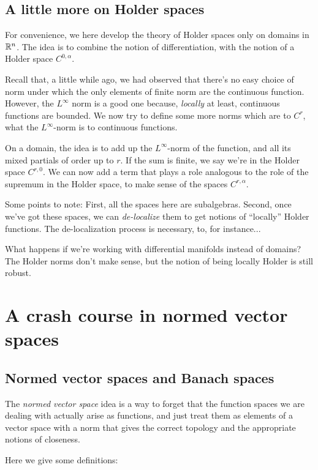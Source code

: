 \documentclass[a4paper]{amsart}
\begin{document}
\subsection{A little more on Holder spaces}

For convenience, we here develop the theory of Holder spaces only on
domains in $\mathbb{R}^n$. The idea is to combine the notion of
differentiation, with the notion of a Holder space $C^{0,\alpha}$.

Recall that, a little while ago, we had observed that there's no easy
choice of norm under which the only elements of finite norm are the
continuous function. However, the $L^\infty$ norm is a good one
because, {\em locally} at least, continuous functions are bounded. We
now try to define some more norms which are to $C^r$, what the
$L^\infty$-norm is to continuous functions.

On a domain, the idea is to add up the $L^\infty$-norm of the
function, and all its mixed partials of order up to $r$. If the sum is
finite, we say we're in the Holder space $C^{r,0}$. We can now add a
term that plays a role analogous to the role of the supremum in the
Holder space, to make sense of the spaces $C^{r,\alpha}$.

Some points to note: First, all the spaces here are
subalgebras. Second, once we've got these spaces, we can {\em
  de-localize} them to get notions of ``locally'' Holder functions. The de-localization process is necessary, to, for instance...

What happens if we're working with differential manifolds instead of
domains? The Holder norms don't make sense, but the notion of being
locally Holder is still robust.

\section{A crash course in normed vector spaces}

\subsection{Normed vector spaces and Banach spaces}

The {\em normed vector space} idea is a way to forget that the
function spaces we are dealing with actually arise as functions, and
just treat them as elements of a vector space with a norm that gives
the correct topology and the appropriate notions of closeness.

Here we give some definitions:
\end{document}
